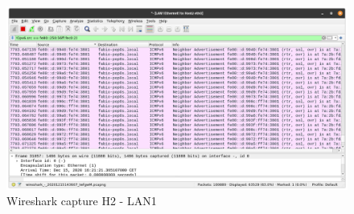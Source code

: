 \begin{figure}[H]
	\centering
	\includegraphics[width=\linewidth]{images/P20_2.png}
	\caption{Wireshark capture H2 - LAN1}
	\label{fig:P20_H2_LAN1}
\end{figure}
